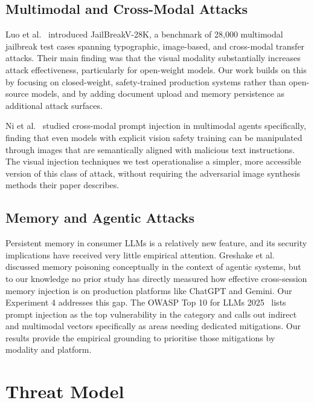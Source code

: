 \documentclass[conference]{IEEEtran}
\begin{document}
\subsection{Multimodal and Cross-Modal Attacks}

Luo et al.~\cite{luo2024jailbreakv} introduced JailBreakV-28K, a benchmark of 28,000 multimodal jailbreak test cases spanning typographic, image-based, and cross-modal transfer attacks. Their main finding was that the visual modality substantially increases attack effectiveness, particularly for open-weight models. Our work builds on this by focusing on closed-weight, safety-trained production systems rather than open-source models, and by adding document upload and memory persistence as additional attack surfaces.

Ni et al.~\cite{ni2025crossmodal} studied cross-modal prompt injection in multimodal agents specifically, finding that even models with explicit vision safety training can be manipulated through images that are semantically aligned with malicious text instructions. The visual injection techniques we test operationalise a simpler, more accessible version of this class of attack, without requiring the adversarial image synthesis methods their paper describes.


\subsection{Memory and Agentic Attacks}

Persistent memory in consumer LLMs is a relatively new feature, and its security implications have received very little empirical attention. Greshake et al.~\cite{greshake2023indirect} discussed memory poisoning conceptually in the context of agentic systems, but to our knowledge no prior study has directly measured how effective cross-session memory injection is on production platforms like ChatGPT and Gemini. Our Experiment 4 addresses this gap. The OWASP Top 10 for LLMs 2025~\cite{owasp2025llm} lists prompt injection as the top vulnerability in the category and calls out indirect and multimodal vectors specifically as areas needing dedicated mitigations. Our results provide the empirical grounding to prioritise those mitigations by modality and platform.

\section{Threat Model}
\label{sec:threat}
\end{document}
